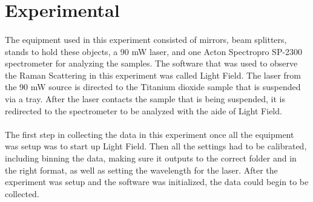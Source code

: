 \documentclass[12pt]{article}
\begin{document}
\section{Experimental}
\begin{multicols}{2}
\paragraph{}
\setlength{\parskip}{1em}
The equipment used in this experiment consisted of mirrors, beam splitters, stands to hold these objects, a 90 mW laser, and one Acton Spectropro SP-2300 spectrometer for analyzing the samples. The software that was used to observe the Raman Scattering in this experiment was called Light Field. The laser from the 90 mW source is directed to the Titanium dioxide sample that is suspended via a tray. After the laser contacts the sample that is being suspended, it is redirected to the spectrometer to be analyzed with the aide of Light Field. 
\paragraph{}
\setlength{\parskip}{1em}
The first step in collecting the data in this experiment once all the equipment was setup was to start up Light Field. Then all the settings had to be calibrated, including binning the data, making sure it outputs to the correct folder and in the right format, as well as setting the wavelength for the laser. After the experiment was setup and the software was initialized, the data could begin to be collected.
\end{multicols}
\end{document}
